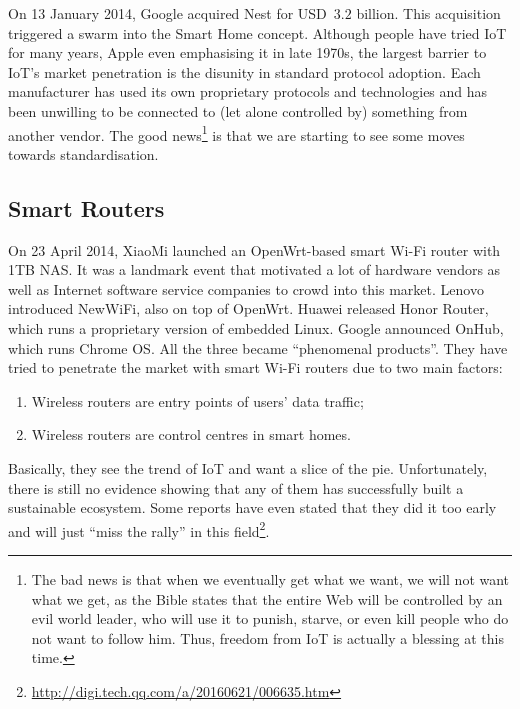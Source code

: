 On 13 January 2014, Google acquired Nest for USD~$3.2$ billion. This acquisition triggered a swarm into the Smart Home concept. Although people have tried IoT for many years, Apple even emphasising it in late 1970s, the largest barrier to IoT's market penetration is the disunity in standard protocol adoption. Each manufacturer has used its own proprietary protocols and technologies and has been unwilling to be connected to (let alone controlled by) something from another vendor. The good news\footnote{The bad news is that when we eventually get what we want, we will not want what we get, as the Bible states that the entire Web will be controlled by an evil world leader, who will use it to punish, starve, or even kill people who do not want to follow him. Thus, freedom from IoT is actually a blessing at this time.} is that we are starting to see some moves towards standardisation. 

\subsection{Smart Routers}\label{sec-smart-routers}
On 23 April 2014, XiaoMi launched an OpenWrt-based smart Wi-Fi router with 1TB NAS. It was a landmark event that motivated a lot of hardware vendors as well as Internet software service companies to crowd into this market. Lenovo introduced NewWiFi, also on top of OpenWrt. Huawei released Honor Router, which runs a proprietary version of embedded Linux. Google announced OnHub, which runs Chrome OS. All the three became ``phenomenal products''. 
They have tried to penetrate the market with smart Wi-Fi routers due to two main factors:
\begin{enumerate}
	\item Wireless routers are entry points of users' data traffic;
	\item Wireless routers are control centres in smart homes.
\end{enumerate}

Basically, they see the trend of IoT and want a slice of the pie. Unfortunately, there is still no evidence showing that any of them has successfully built a sustainable ecosystem. Some reports have even stated that they did it too early and will just ``miss the rally'' in this field\footnote{\url{http://digi.tech.qq.com/a/20160621/006635.htm}}. 

